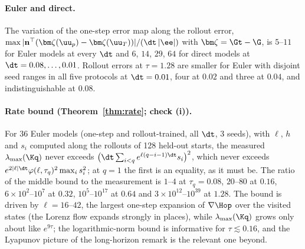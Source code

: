 \paragraph{Euler and direct.}
The variation of the one-step error map along the rollout error, $\max|\mathbf n^\top(\bm\zeta(\uu_p) - \bm\zeta(\uu_T))|/(\dt\,|\ee|)$ with $\bm\zeta = \Gt - \G$, is $5$--$11$ for Euler models at every $\dt$ and $6$, $14$, $29$, $64$ for direct models at $\dt = 0.08,\dots,0.01$.
Rollout errors at $\tau = 1.28$ are smaller for Euler with disjoint seed ranges in all five protocols at $\dt = 0.01$, four at $0.02$ and three at $0.04$, and indistinguishable at $0.08$.

\paragraph{Rate bound (Theorem~\ref{thm:rate}; check (i)).}
For 36 Euler models (one-step and rollout-trained, all $\dt$, 3 seeds), with $\ell$, $h$ and $s_i$ computed along the rollouts of 128 held-out starts, the measured $\lambda_{\max}(\Kq)$ never exceeds $\big(\dt\sum_{i<q}e^{\ell(q-i-1)\dt}s_i\big)^2$, which never exceeds $e^{2|\ell|\dt}\varphi(\ell,\tau_q)^2\max_i s_i^2$; at $q = 1$ the first is an equality, as it must be.
The ratio of the middle bound to the measurement is $1$--$4$ at $\tau_q = 0.08$, $20$--$80$ at $0.16$, $6\times10^2$--$10^7$ at $0.32$, $10^5$--$10^{17}$ at $0.64$ and $3\times10^{12}$--$10^{39}$ at $1.28$.
The bound is driven by $\ell = 16$--$42$, the largest one-step expansion of $\nabla\Hop$ over the visited states (the Lorenz flow expands strongly in places), while $\lambda_{\max}(\Kq)$ grows only about like $e^{9\tau}$; the logarithmic-norm bound is informative for $\tau\lesssim0.16$, and the Lyapunov picture of the long-horizon remark is the relevant one beyond.

